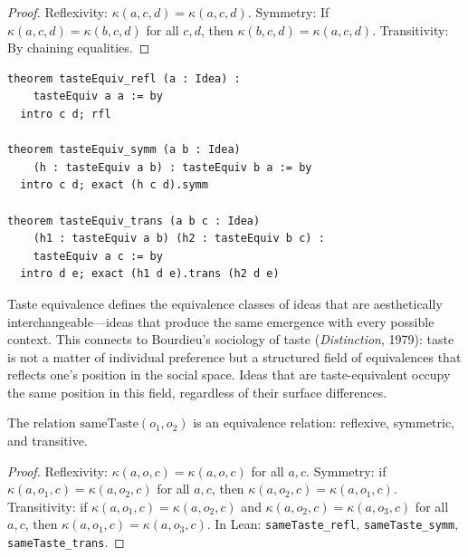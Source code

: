 \begin{proof}
Reflexivity: $\kappa(a, c, d) = \kappa(a, c, d)$.
Symmetry: If $\kappa(a, c, d) = \kappa(b, c, d)$ for all $c, d$,
then $\kappa(b, c, d) = \kappa(a, c, d)$.
Transitivity: By chaining equalities.
\end{proof}

\begin{lstlisting}
theorem tasteEquiv_refl (a : Idea) :
    tasteEquiv a a := by
  intro c d; rfl

theorem tasteEquiv_symm (a b : Idea)
    (h : tasteEquiv a b) : tasteEquiv b a := by
  intro c d; exact (h c d).symm

theorem tasteEquiv_trans (a b c : Idea)
    (h1 : tasteEquiv a b) (h2 : tasteEquiv b c) :
    tasteEquiv a c := by
  intro d e; exact (h1 d e).trans (h2 d e)
\end{lstlisting}

\begin{interpretation}
\label{int:taste-bourdieu}
Taste equivalence defines the equivalence classes of ideas that are
aesthetically interchangeable---ideas that produce the same emergence
with every possible context.  This connects to Bourdieu's sociology of
taste (\emph{Distinction}, 1979): taste is not a matter of individual
preference but a structured field of equivalences that reflects one's
position in the social space.  Ideas that are taste-equivalent occupy
the same position in this field, regardless of their surface differences.
\end{interpretation}

\begin{theorem}
\label{thm:taste-equiv}
The relation $\mathrm{sameTaste}(o_1, o_2)$ is an equivalence relation: reflexive, symmetric, and transitive.
\end{theorem}

\begin{proof}
Reflexivity: $\kappa(a, o, c) = \kappa(a, o, c)$ for all $a, c$.  Symmetry: if $\kappa(a, o_1, c) = \kappa(a, o_2, c)$ for all $a, c$, then $\kappa(a, o_2, c) = \kappa(a, o_1, c)$.  Transitivity: if $\kappa(a, o_1, c) = \kappa(a, o_2, c)$ and $\kappa(a, o_2, c) = \kappa(a, o_3, c)$ for all $a, c$, then $\kappa(a, o_1, c) = \kappa(a, o_3, c)$.  In Lean: \texttt{sameTaste\_refl}, \texttt{sameTaste\_symm}, \texttt{sameTaste\_trans}.
\end{proof}

